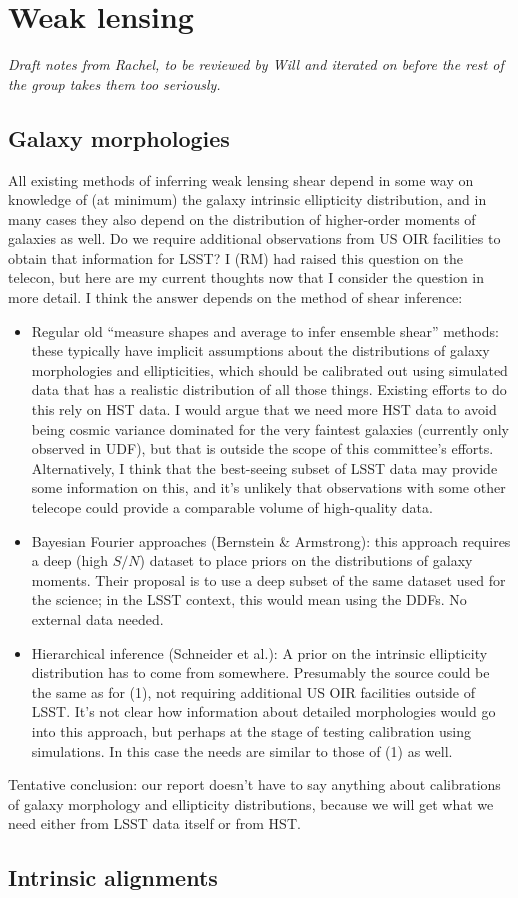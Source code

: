 \section{Weak lensing}

{\em Draft notes from Rachel, to be reviewed by Will and iterated on before the rest of the group
  takes them too seriously.}

\subsection{Galaxy morphologies}

All existing methods of inferring weak lensing shear depend in some way on knowledge of (at minimum)
the galaxy intrinsic ellipticity distribution, and in many cases they also depend on the
distribution of higher-order moments of galaxies as well.  Do we require additional observations
from US OIR facilities to obtain that information for LSST?  I (RM) had raised this question on the
telecon, but here are my current thoughts now that I consider the question in more detail.  I think
the answer depends on the method of shear inference:

\begin{itemize}
\item Regular old ``measure shapes and average to infer ensemble shear'' methods: these typically
  have implicit assumptions about the distributions of galaxy morphologies and ellipticities, which
  should be calibrated out using simulated data that has a realistic distribution of all those
  things.  Existing efforts to do this rely on HST data.  I would argue that we need more HST data
  to avoid being cosmic variance dominated for the very faintest galaxies (currently only observed
  in UDF), but that is outside the scope of this committee's efforts.  Alternatively, I think that
  the best-seeing subset of LSST data may provide some information on this, and it's unlikely that
  observations with some other telecope could provide a comparable volume of high-quality data.
\item Bayesian Fourier approaches (Bernstein \& Armstrong): this approach requires a deep (high
  $S/N$) dataset to place priors on the distributions of galaxy moments.  Their proposal is to use a
  deep subset of the same dataset used for the science; in the LSST context, this would mean using
  the DDFs.  No external data needed.
\item Hierarchical inference (Schneider et al.): A prior on the intrinsic ellipticity distribution
  has to come from somewhere.  Presumably the source could be the same as for (1), not requiring
  additional US OIR facilities outside of LSST.  It's not clear how information about detailed
  morphologies would go into this approach, but perhaps at the stage of testing calibration using
  simulations.  In this case the needs are similar to those of (1) as well.
\end{itemize}

Tentative conclusion: our report doesn't have to say anything about calibrations of galaxy
morphology and ellipticity distributions, because we will get what we need either from LSST data
itself or from HST.

\subsection{Intrinsic alignments}

